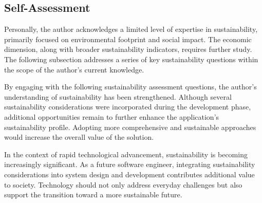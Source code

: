 \subsection{Self-Assessment}

Personally, the author acknowledges a limited level of expertise in sustainability, primarily focused on environmental footprint and social impact. The economic dimension, along with broader sustainability indicators, requires further study. The following subsection addresses a series of key sustainability questions within the scope of the author's current knowledge.

By engaging with the following sustainability assessment questions, the author's understanding of sustainability has been strengthened. Although several sustainability considerations were incorporated during the development phase, additional opportunities remain to further enhance the application's sustainability profile. Adopting more comprehensive and sustainable approaches would increase the overall value of the solution. 

In the context of rapid technological advancement, sustainability is becoming increasingly significant. As a future software engineer, integrating sustainability considerations into system design and development contributes additional value to society. Technology should not only address everyday challenges but also support the transition toward a more sustainable future.
